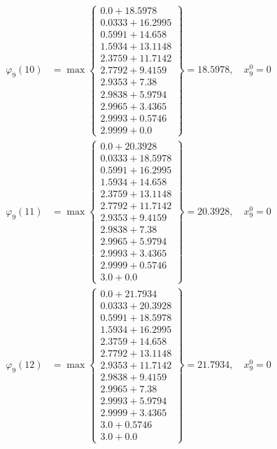 \documentclass{article}
\begin{document}
\begin{align*}
  
  
  
\varphi_{9}(10) &= \max \left\{ \begin{array}{c}
0.0 + 18.5978 \\
 0.0333 + 16.2995 \\
 0.5991 + 14.658 \\
 1.5934 + 13.1148 \\
 2.3759 + 11.7142 \\
 2.7792 + 9.4159 \\
 2.9353 + 7.38 \\
 2.9838 + 5.9794 \\
 2.9965 + 3.4365 \\
 2.9993 + 0.5746 \\
 2.9999 + 0.0
\end{array} \right\}=18.5978,\quad x_{9}^0=0\\
  
  
  
  
\varphi_{9}(11) &= \max \left\{ \begin{array}{c}
0.0 + 20.3928 \\
 0.0333 + 18.5978 \\
 0.5991 + 16.2995 \\
 1.5934 + 14.658 \\
 2.3759 + 13.1148 \\
 2.7792 + 11.7142 \\
 2.9353 + 9.4159 \\
 2.9838 + 7.38 \\
 2.9965 + 5.9794 \\
 2.9993 + 3.4365 \\
 2.9999 + 0.5746 \\
 3.0 + 0.0
\end{array} \right\}=20.3928,\quad x_{9}^0=0\\
  
  
  
  
\varphi_{9}(12) &= \max \left\{ \begin{array}{c}
0.0 + 21.7934 \\
 0.0333 + 20.3928 \\
 0.5991 + 18.5978 \\
 1.5934 + 16.2995 \\
 2.3759 + 14.658 \\
 2.7792 + 13.1148 \\
 2.9353 + 11.7142 \\
 2.9838 + 9.4159 \\
 2.9965 + 7.38 \\
 2.9993 + 5.9794 \\
 2.9999 + 3.4365 \\
 3.0 + 0.5746 \\
 3.0 + 0.0
\end{array} \right\}=21.7934,\quad x_{9}^0=0\\
  

\end{align*}
\end{document}
